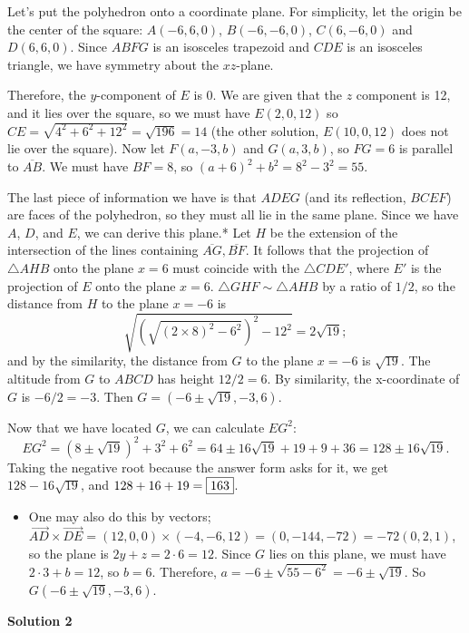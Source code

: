 \begin{enumerate}
 Let's put the polyhedron onto a coordinate plane. For simplicity, let the origin be the center of the square: $A(-6,6,0)$, $B(-6,-6,0)$, $C(6,-6,0)$ and $D(6,6,0)$. Since $ABFG$ is an isosceles trapezoid and $CDE$ is an isosceles triangle, we have symmetry about the $xz$-plane.

 Therefore, the $y$-component of $E$ is 0. We are given that the $z$ component is 12, and it lies over the square, so we must have $E(2,0,12)$ so $CE=\sqrt{4^2+6^2+12^2}=\sqrt{196}=14$ (the other solution, $E(10,0,12)$ does not lie over the square). Now let $F(a,-3,b)$ and $G(a,3,b)$, so $FG=6$ is parallel to $\overline{AB}$. We must have $BF=8$, so $(a+6)^2+b^2=8^2-3^2=55$.

 The last piece of information we have is that $ADEG$ (and its reflection, $BCEF$) are faces of the polyhedron, so they must all lie in the same plane. Since we have $A$, $D$, and $E$, we can derive this plane.* Let $H$ be the extension of the intersection of the lines containing $\overline{AG}, \overline{BF}$. It follows that the projection of $\triangle AHB$ onto the plane $x = 6$ must coincide with the $\triangle CDE'$, where $E'$ is the projection of $E$ onto the plane $x = 6$. $\triangle GHF \sim \triangle AHB$ by a ratio of $1/2$, so the distance from $H$ to the plane $x = -6$ is 
 \[\sqrt{\left(\sqrt{(2 \times 8)^2 - 6^2}\right)^2 - 12^2} = 2\sqrt{19};\] and by the similarity, the distance from $G$ to the plane $x = -6$ is $\sqrt{19}$. The altitude from $G$ to $ABCD$ has height $12/2 = 6$. By similarity, the x-coordinate of $G$ is $-6/2 = -3$. Then $G = (-6 \pm \sqrt{19}, -3, 6)$.

 Now that we have located $G$, we can calculate $EG^2$:
 \[EG^2=(8\pm\sqrt{19})^2+3^2+6^2=64\pm16\sqrt{19}+19+9+36=128\pm16\sqrt{19}.\] Taking the negative root because the answer form asks for it, we get $128-16\sqrt{19}$, and $128+16+19=\fbox{163}$.

 
            \begin{itemize}
        \item One may also do this by vectors; $\overrightarrow{AD}\times\overrightarrow{DE}=(12,0,0)\times(-4,-6,12)=(0,-144,-72)=-72(0,2,1)$, so the plane is $2y+z=2\cdot6=12$. Since $G$ lies on this plane, we must have $2\cdot3+b=12$, so $b=6$. Therefore, $a=-6\pm\sqrt{55-6^2}=-6\pm\sqrt{19}$. So $G(-6\pm\sqrt{19},-3,6)$.
            \end{itemize}
            



\textbf{Solution 2}


\end{enumerate}
